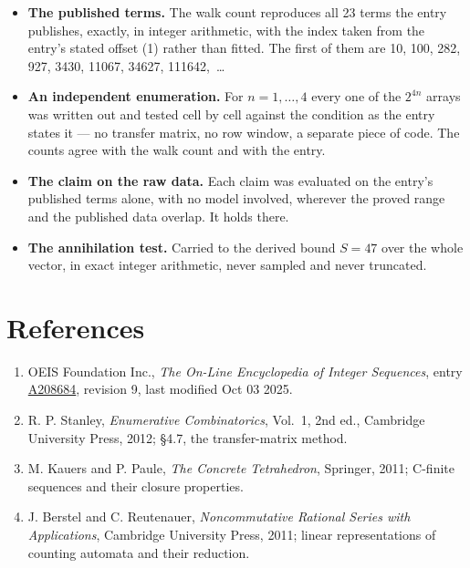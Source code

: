 \documentclass[11pt]{article}
\theoremstyle{definition}
\begin{document}
\begin{itemize}

\item {\bfseries The published terms.} The walk count reproduces all 23 terms the entry publishes, exactly, in integer arithmetic, with the index taken from the entry's stated offset (1) rather than fitted. The first of them are 10, 100, 282, 927, 3430, 11067, 34627, 111642,~\dots

\item {\bfseries An independent enumeration.} For $n = 1,\dots,4$ every one of the $2^{4n}$ arrays was written out and tested cell by cell against the condition as the entry states it --- no transfer matrix, no row window, a separate piece of code. The counts agree with the walk count and with the entry.

\item {\bfseries The claim on the raw data.} Each claim was evaluated on the entry's published terms alone, with no model involved, wherever the proved range and the published data overlap. It holds there.

\item {\bfseries The annihilation test.} Carried to the derived bound $S = 47$ over the whole vector, in exact integer arithmetic, never sampled and never truncated.

\end{itemize}

\section{References}

\begin{enumerate}

\item OEIS Foundation Inc., \emph{The On-Line Encyclopedia of Integer Sequences}, entry \href{https://oeis.org/A208684}{A208684}, revision 9, last modified Oct 03 2025.

\item R. P. Stanley, \emph{Enumerative Combinatorics}, Vol.~1, 2nd ed., Cambridge University Press, 2012; \S4.7, the transfer-matrix method.

\item M. Kauers and P. Paule, \emph{The Concrete Tetrahedron}, Springer, 2011; C-finite sequences and their closure properties.

\item J. Berstel and C. Reutenauer, \emph{Noncommutative Rational Series with Applications}, Cambridge University Press, 2011; linear representations of counting automata and their reduction.

\end{enumerate}
\end{document}
